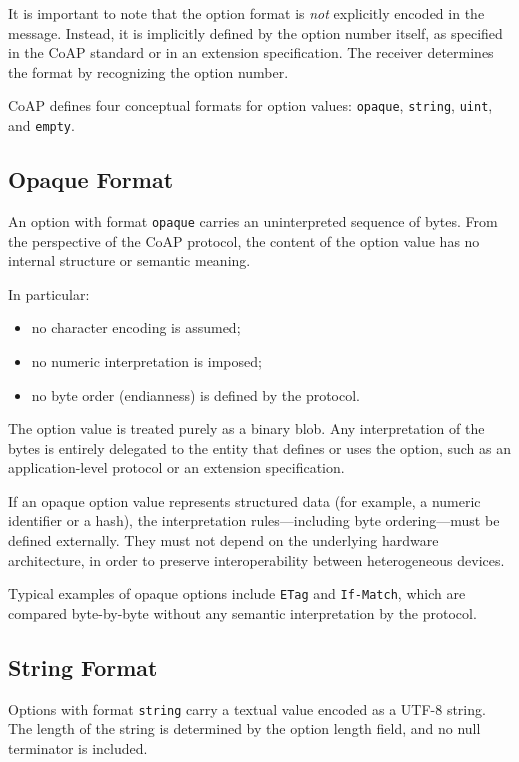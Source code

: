 \documentclass{scrbook}
\begin{document}
It is important to note that the option format is \emph{not} explicitly encoded in the message. Instead, it is implicitly defined by the option number itself, as specified in the CoAP standard or in an extension specification. The receiver determines the format by recognizing the option number.

CoAP defines four conceptual formats for option values: \texttt{opaque}, \texttt{string}, \texttt{uint}, and \texttt{empty}.

\subsection{Opaque Format}

An option with format \texttt{opaque} carries an uninterpreted sequence of bytes. From the perspective of the CoAP protocol, the content of the option value has no internal structure or semantic meaning.

In particular:
\begin{itemize}
    \item no character encoding is assumed;
    \item no numeric interpretation is imposed;
    \item no byte order (endianness) is defined by the protocol.
\end{itemize}

The option value is treated purely as a binary blob. Any interpretation of the bytes is entirely delegated to the entity that defines or uses the option, such as an application-level protocol or an extension specification.

If an opaque option value represents structured data (for example, a numeric identifier or a hash), the interpretation rules—including byte ordering—must be defined externally. They must not depend on the underlying hardware architecture, in order to preserve interoperability between heterogeneous devices.

Typical examples of opaque options include \texttt{ETag} and \texttt{If-Match}, which are compared byte-by-byte without any semantic interpretation by the protocol.

\subsection{String Format}

Options with format \texttt{string} carry a textual value encoded as a UTF-8 string. The length of the string is determined by the option length field, and no null terminator is included.
\end{document}
